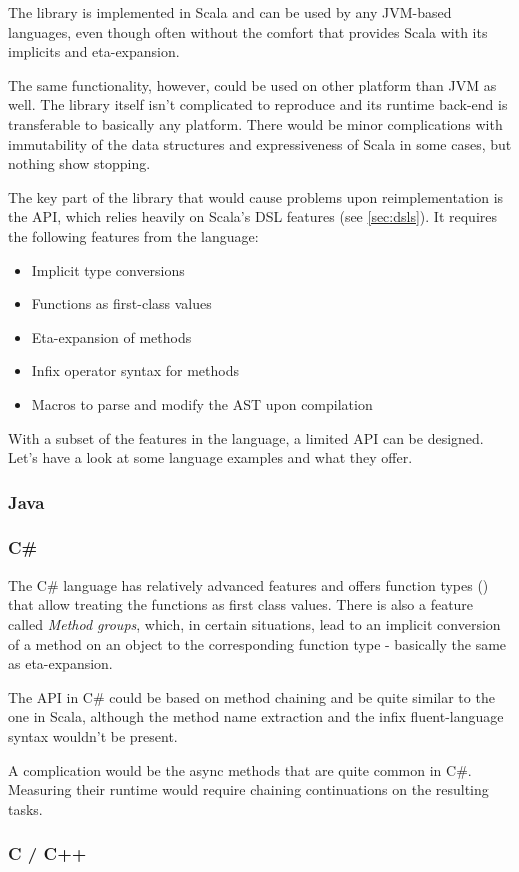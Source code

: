 The library is implemented in Scala and can be used by any JVM-based languages, even though often without the comfort that provides Scala with its implicits and eta-expansion.

The same functionality, however, could be used on other platform than JVM as well. The library itself isn't complicated to reproduce and its runtime back-end is transferable to basically any platform. There would be minor complications with immutability of the data structures and expressiveness of Scala in some cases, but nothing show stopping.

The key part of the library that would cause problems upon reimplementation is the API, which relies heavily on Scala's DSL features (see \ref{sec:dsls}). It requires the following features from the language:

\begin{itemize}
	\item Implicit type conversions
	\item Functions as first-class values
	\item Eta-expansion of methods
	\item Infix operator syntax for methods
	\item Macros to parse and modify the AST upon compilation
\end{itemize}

With a subset of the features in the language, a limited API can be designed. Let's have a look at some language examples and what they offer.

\subsubsection{Java}

\subsubsection{C\#}

The C\# language has relatively advanced features and offers function types () that allow treating the functions as first class values. There is also a feature called \textit{Method groups}, which, in certain situations, lead to an implicit conversion of a method on an object to the corresponding function type - basically the same as eta-expansion.


The API in C\# could be based on method chaining and be quite similar to the one in Scala, although the method name extraction and the infix fluent-language syntax wouldn't be present.

A complication would be the async methods that are quite common in C\#. Measuring their runtime would require chaining continuations on the resulting tasks.

\subsubsection{C / C++}